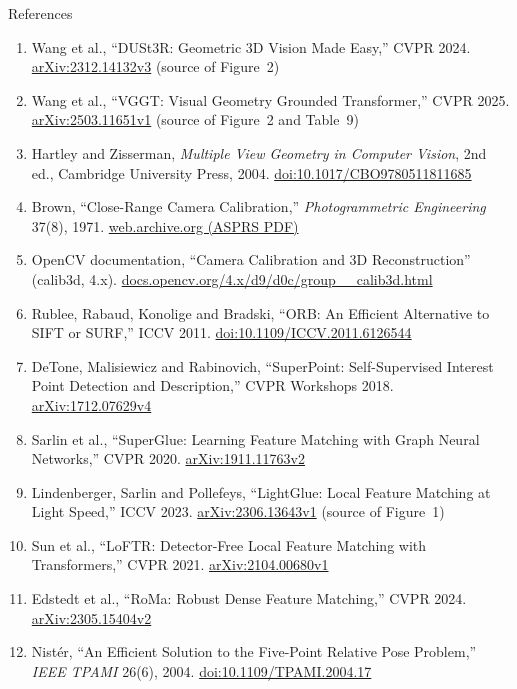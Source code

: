 \begin{frame}[allowframebreaks]{References}
\begin{enumerate}
    \item Wang et al., ``DUSt3R: Geometric 3D Vision Made Easy,'' CVPR 2024. \href{https://arxiv.org/abs/2312.14132v3}{arXiv:2312.14132v3} (source of Figure~2)
    \item Wang et al., ``VGGT: Visual Geometry Grounded Transformer,'' CVPR 2025. \href{https://arxiv.org/abs/2503.11651v1}{arXiv:2503.11651v1} (source of Figure~2 and Table~9)
    \item Hartley and Zisserman, \emph{Multiple View Geometry in Computer Vision}, 2nd ed., Cambridge University Press, 2004. \href{https://doi.org/10.1017/CBO9780511811685}{doi:10.1017/CBO9780511811685}
    \item Brown, ``Close-Range Camera Calibration,'' \emph{Photogrammetric Engineering} 37(8), 1971. \href{https://web.archive.org/web/20250717145041/https://www.asprs.org/wp-content/uploads/pers/1971journal/aug/1971_aug_855-866.pdf}{web.archive.org (ASPRS PDF)}
    \item OpenCV documentation, ``Camera Calibration and 3D Reconstruction'' (calib3d, 4.x). \href{https://docs.opencv.org/4.x/d9/d0c/group__calib3d.html}{docs.opencv.org/4.x/d9/d0c/group\_\_calib3d.html}
    \item Rublee, Rabaud, Konolige and Bradski, ``ORB: An Efficient Alternative to SIFT or SURF,'' ICCV 2011. \href{https://doi.org/10.1109/ICCV.2011.6126544}{doi:10.1109/ICCV.2011.6126544}
    \item DeTone, Malisiewicz and Rabinovich, ``SuperPoint: Self-Supervised Interest Point Detection and Description,'' CVPR Workshops 2018. \href{https://arxiv.org/abs/1712.07629v4}{arXiv:1712.07629v4}
    \item Sarlin et al., ``SuperGlue: Learning Feature Matching with Graph Neural Networks,'' CVPR 2020. \href{https://arxiv.org/abs/1911.11763v2}{arXiv:1911.11763v2}
    \item Lindenberger, Sarlin and Pollefeys, ``LightGlue: Local Feature Matching at Light Speed,'' ICCV 2023. \href{https://arxiv.org/abs/2306.13643v1}{arXiv:2306.13643v1} (source of Figure~1)
    \item Sun et al., ``LoFTR: Detector-Free Local Feature Matching with Transformers,'' CVPR 2021. \href{https://arxiv.org/abs/2104.00680v1}{arXiv:2104.00680v1}
    \item Edstedt et al., ``RoMa: Robust Dense Feature Matching,'' CVPR 2024. \href{https://arxiv.org/abs/2305.15404v2}{arXiv:2305.15404v2}
    \item Nist\'er, ``An Efficient Solution to the Five-Point Relative Pose Problem,'' \emph{IEEE TPAMI} 26(6), 2004. \href{https://doi.org/10.1109/TPAMI.2004.17}{doi:10.1109/TPAMI.2004.17}

\end{enumerate}
\end{frame}
